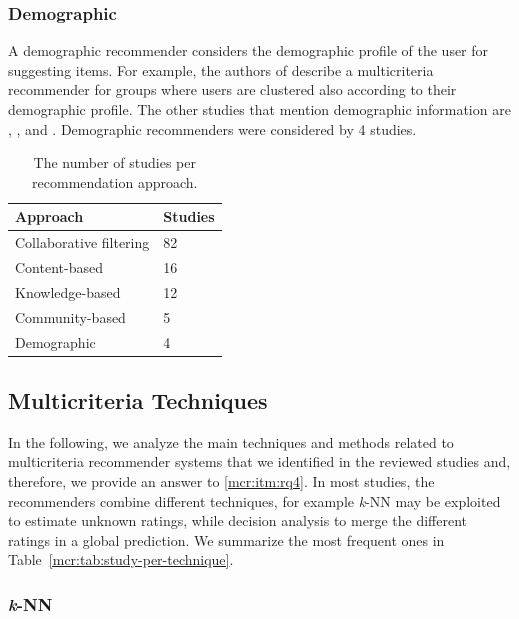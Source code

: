 \subsubsection{Demographic}

A demographic recommender considers the demographic profile of the user for suggesting items. For example, the authors of  describe a multicriteria recommender for groups where users are clustered also according to their demographic profile. The other studies that mention demographic information are , , and . Demographic recommenders were considered by 4 studies.

\begin{table}
\centering
\begin{tabular}{@{}ll@{}}
\toprule
Approach                & Studies \\ \midrule
Collaborative filtering & 82      \\
Content-based           & 16      \\
Knowledge-based         & 12      \\
Community-based         & 5       \\
Demographic             & 4       \\ \bottomrule
\end{tabular}
\caption[Studies per recommendation approach]{The number of studies per recommendation approach.}
\label{mcr:tab:study-per-approach}
\end{table}

\subsection{Multicriteria Techniques}
\label{mcr:sec:techniques}

In the following, we analyze the main techniques and methods related to multicriteria recommender systems that we identified in the reviewed studies and, therefore, we provide an answer to \ref{mcr:itm:rq4}. In most studies, the recommenders combine different techniques, for example \textit{k}-NN may be exploited to estimate unknown ratings, while decision analysis to merge the different ratings in a global prediction. We summarize the most frequent ones in Table~\ref{mcr:tab:study-per-technique}.

\subsubsection{\textit{k}-NN}

